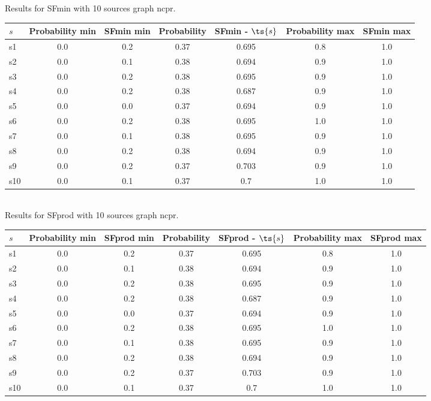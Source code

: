 \documentclass{article}
\begin{document}
\noindent Results for SFmin with 10 sources graph ncpr.

\noindent\begin{tabular}{|l|c|c|c|c|c|c|}
\hline
$s$& Probability min & SFmin min & Probability & SFmin - $\ts{s}$ & Probability max & SFmin max\\
\hline
s1 &0.0 & 0.2 & 0.37 & 0.695 & 0.8 & 1.0\\
\hline
s2 &0.0 & 0.1 & 0.38 & 0.694 & 0.9 & 1.0\\
\hline
s3 &0.0 & 0.2 & 0.38 & 0.695 & 0.9 & 1.0\\
\hline
s4 &0.0 & 0.2 & 0.38 & 0.687 & 0.9 & 1.0\\
\hline
s5 &0.0 & 0.0 & 0.37 & 0.694 & 0.9 & 1.0\\
\hline
s6 &0.0 & 0.2 & 0.38 & 0.695 & 1.0 & 1.0\\
\hline
s7 &0.0 & 0.1 & 0.38 & 0.695 & 0.9 & 1.0\\
\hline
s8 &0.0 & 0.2 & 0.38 & 0.694 & 0.9 & 1.0\\
\hline
s9 &0.0 & 0.2 & 0.37 & 0.703 & 0.9 & 1.0\\
\hline
s10 &0.0 & 0.1 & 0.37 & 0.7 & 1.0 & 1.0\\
\hline
\end{tabular}\\

\noindent Results for SFprod with 10 sources graph ncpr.

\noindent\begin{tabular}{|l|c|c|c|c|c|c|}
\hline
$s$& Probability min & SFprod min & Probability & SFprod - $\ts{s}$ & Probability max & SFprod max\\
\hline
s1 &0.0 & 0.2 & 0.37 & 0.695 & 0.8 & 1.0\\
\hline
s2 &0.0 & 0.1 & 0.38 & 0.694 & 0.9 & 1.0\\
\hline
s3 &0.0 & 0.2 & 0.38 & 0.695 & 0.9 & 1.0\\
\hline
s4 &0.0 & 0.2 & 0.38 & 0.687 & 0.9 & 1.0\\
\hline
s5 &0.0 & 0.0 & 0.37 & 0.694 & 0.9 & 1.0\\
\hline
s6 &0.0 & 0.2 & 0.38 & 0.695 & 1.0 & 1.0\\
\hline
s7 &0.0 & 0.1 & 0.38 & 0.695 & 0.9 & 1.0\\
\hline
s8 &0.0 & 0.2 & 0.38 & 0.694 & 0.9 & 1.0\\
\hline
s9 &0.0 & 0.2 & 0.37 & 0.703 & 0.9 & 1.0\\
\hline
s10 &0.0 & 0.1 & 0.37 & 0.7 & 1.0 & 1.0\\
\hline
\end{tabular}\\
\end{document}
